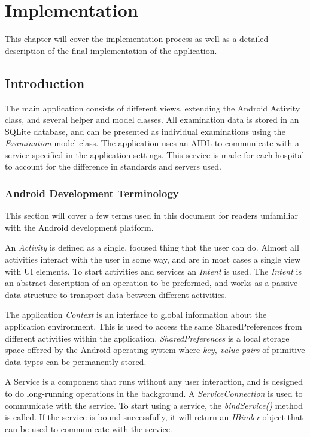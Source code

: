 \section{Implementation}

This chapter will cover the implementation process as well as a detailed description of the final implementation of the application.

\subsection{Introduction}

The main application consists of different views, extending the Android Activity class, and several helper and model classes. All examination data is stored in an SQLite database, and can be presented as individual examinations using the \emph{Examination} model class. The application uses an AIDL to communicate with a service specified in the application settings. This service is made for each hospital to account for the difference in standards and servers used.

\subsubsection*{Android Development Terminology}
This section will cover a few terms used in this document for readers unfamiliar with the Android development platform.

An \emph{Activity} is defined as a single, focused thing that the user can do. Almost all activities interact with the user in some way, and are in most cases a single view with UI elements. To start activities and services an \emph{Intent} is used. The \emph{Intent} is an abstract description of an operation to be preformed, and works as a passive data structure to transport data between different activities.

The application \emph{Context} is an interface to global information about the application environment. This is used to access the same SharedPreferences from different activities within the application. \emph{SharedPreferences} is a local storage space offered by the Android operating system where \emph{key, value pairs} of primitive data types can be permanently stored.

A Service is a component that runs without any user interaction, and is designed to do long-running operations in the background. A \emph{ServiceConnection} is used to communicate with the service. To start using a service, the \emph{bindService()} method is called. If the service is bound successfully, it will return an \emph{IBinder} object that can be used to communicate with the service.

